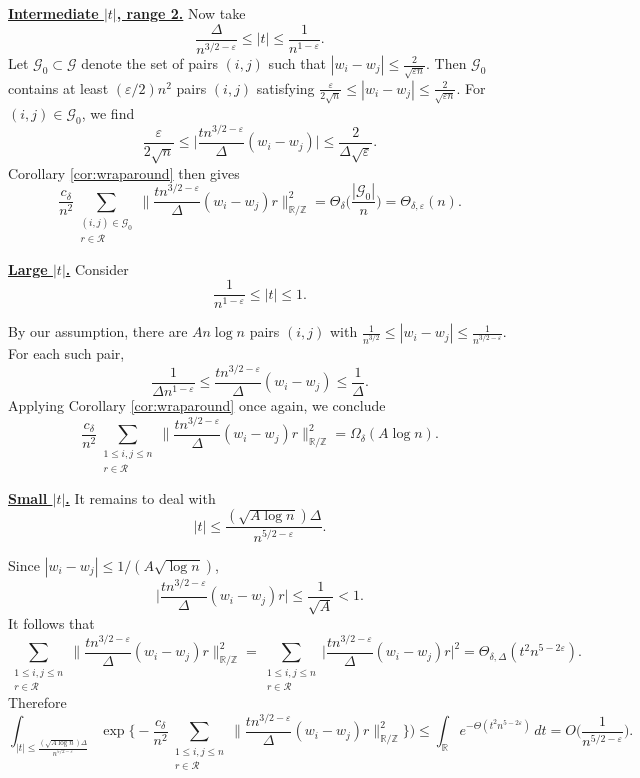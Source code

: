 \documentclass[reqno]{amsart}
\newcommand\R{{\mathbb{R}}}
\newcommand\Z{{\mathbb{Z}}}
\newcommand\eps{{\varepsilon}}
\newcommand\CG{{\mathcal G}}
\newcommand\CR{{\mathcal R}}
\theoremstyle{plain}
\theoremstyle{definition}
\begin{document}
\underline{\bf Intermediate \(|t|\), range 2.}  
Now take
\[
\frac{\Delta}{n^{3/2-\eps}} \le |t| \le \frac{1}{n^{1-\eps}}.
\]
Let $\CG_0 \subset \CG$ denote the set of pairs $(i,j)$ such that $|w_i - w_j| \le \frac{2}{\sqrt{\eps n}}$. Then $\CG_0$ contains at least $(\eps/2) n^2$ pairs $(i,j)$ satisfying $\frac{\eps}{2\sqrt{n}} \le |w_i - w_j| \le \frac{2}{\sqrt{\eps n}}$.
For $(i,j)\in \CG_{0}$, we find
\[
\frac{\eps}{2\sqrt{n}}\le \Big|\frac{t n^{3/2-\eps}}{\Delta} (w_{i}-w_{j})\Big|\le \frac{2}{\Delta\sqrt{\eps}}.
\]
Corollary \ref{cor:wraparound} then gives
\[
\frac{c_{\delta}}{n^{2}} \sum_{\substack{(i,j) \in \CG_{0}\\ r \in \CR}} 
\Big\| \frac{t n^{3/2-\eps}}{\Delta} (w_{i}-w_{j}) r \Big\|_{\R/\Z}^{2} 
=\Theta_{\delta}\Big(\frac{|\CG_{0}|}{n}\Big)= \Theta_{\delta,\eps}(n).
\]


\underline{\bf Large \(|t|\).} Consider $$\frac{1}{n^{1-\eps}} \le |t| \le 1.$$

By our assumption, there are \(A n \log n\) pairs \((i,j)\) with $\frac{1}{n^{3/2}} \le |w_{i} - w_{j}| \le \frac{1}{n^{3/2-\eps}}$. For each such pair,
\[
\frac{1}{\Delta n^{1-\eps}}\le \frac{t n^{3/2-\eps}}{\Delta} (w_{i}-w_{j})\le \frac{1}{\Delta}.
\]
Applying Corollary \ref{cor:wraparound} once again, we conclude
\[
\frac{c_{\delta}}{n^{2}} \sum_{\substack{1\le i,j\le n \\ r\in \CR}} 
\Big\| \frac{t n^{3/2-\eps}}{\Delta} (w_{i}-w_{j})r \Big\|_{\R/\Z}^{2} 
= \Omega_{\delta}(A\log n).
\]


\underline{\bf Small \(|t|\).}  
It remains to deal with
$$|t| \le \frac{(\sqrt{A\log n})\Delta}{n^{5/2-\eps}}.$$

Since $|w_{i}- w_{j}| \le 1/(A \sqrt{\log n})$,
\[
\Big| \frac{t n^{3/2-\eps}}{\Delta} (w_{i}-w_{j}) r\Big| \le \frac{1}{\sqrt{A}}<1.
\]
It follows that
\[
\sum_{\substack{1\le i,j \le n \\ r\in \CR}} 
\Big\| \frac{t n^{3/2-\eps}}{\Delta} (w_{i}-w_{j}) r\Big\|^2_{\R/\Z}= \sum_{\substack{1\le i,j \le n \\ r\in \CR}} 
\Big| \frac{t n^{3/2-\eps}}{\Delta} (w_{i}-w_{j}) r\Big|^2
=\Theta_{\delta,\Delta}(t^{2} n^{5-2\eps}).
\]
Therefore
\[
\int_{|t|\le \frac{(\sqrt{A\log n})\Delta}{n^{5/2-\eps}}} \exp\Big\{- \frac{c_{\delta}}{n^{2}} \sum_{\substack{1\le i,j \le n \\r \in \CR}} \Big\| \frac{t n^{3/2-\eps}}{\Delta} (w_{i}-w_{j}) r\Big\|_{\R/\Z}^{2}\Big\}\Big)\le \int_{\R} e^{-\Theta(t^{2} n^{5-2\eps})} \, dt 
= O\Big( \frac{1}{n^{5/2-\eps}} \Big).
\]
\end{document}
